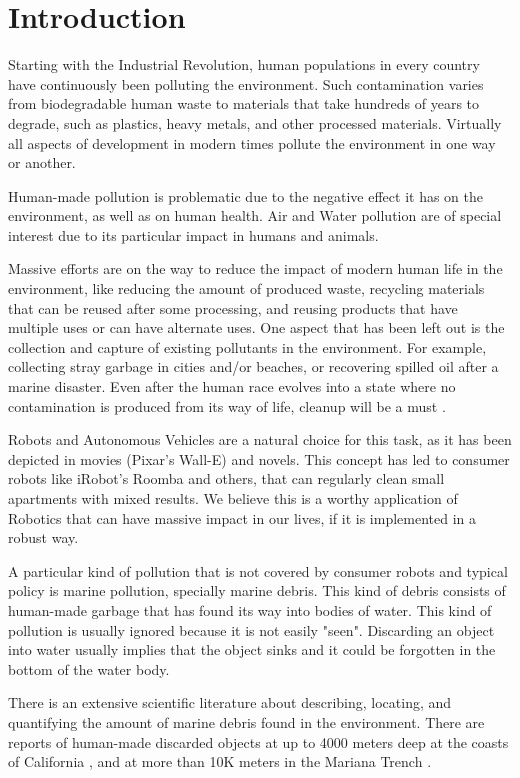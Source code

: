 \chapter{Introduction}
\label{chapter:introduction}

Starting with the Industrial Revolution, human populations in every country have continuously been polluting the environment. Such contamination varies from biodegradable human waste to materials that take hundreds of years to degrade, such as plastics, heavy metals, and other processed materials. Virtually all aspects of development in modern times pollute the environment in one way or another.

Human-made pollution is problematic due to the negative effect it has on the environment, as well as on human health. Air and Water pollution are of special interest due to its particular impact in humans and animals. 

Massive efforts are on the way to reduce the impact of modern human life in the environment, like reducing the amount of produced waste, recycling materials that can be reused after some processing, and reusing products that have multiple uses or can have alternate uses. One aspect that has been left out is the collection and capture of existing pollutants in the environment. For example, collecting stray garbage in cities and/or beaches, or recovering spilled oil after a marine disaster. Even after the human race evolves into a state where no contamination is produced from its way of life, cleanup will be a must \cite{mcilgorm2008understanding}.

Robots and Autonomous Vehicles are a natural choice for this task, as it has been depicted in movies (Pixar's Wall-E) and novels. This concept has led to consumer robots like iRobot's Roomba and others, that can regularly clean small apartments with mixed results. We believe this is a worthy application of Robotics that can have massive impact in our lives, if it is implemented in a robust way.

A particular kind of pollution that is not covered by consumer robots and typical policy is marine pollution, specially marine debris. This kind of debris consists of human-made garbage that has found its way into bodies of water. This kind of pollution is usually ignored because it is not easily "seen". Discarding an object into water usually implies that the object sinks and it could be forgotten in the bottom of the water body.

There is an extensive scientific literature\cite{li2016plastic} about describing, locating, and quantifying the amount of marine debris found in the environment. There are reports of human-made discarded objects at up to 4000 meters deep at the coasts of California \cite[1em]{schlining2013debris}, and at more than 10K meters in the Mariana Trench \cite[1em]{chiba2018human}.

